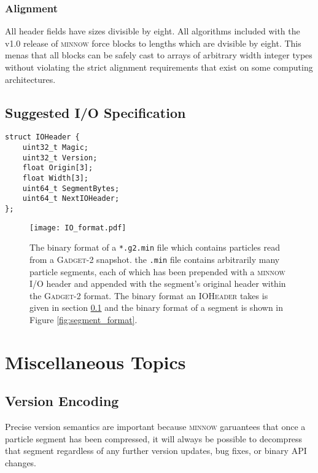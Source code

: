 \documentclass[numberedappendix,apj]{emulateapj}
\begin{document}
\subsubsection{Alignment}

All header fields have sizes divisible by eight. All algorithms included with
the v1.0 release of \textsc{minnow} force blocks to lengths which are dvisible
by eight. This menas that all blocks can be safely cast to arrays of
arbitrary width integer types without violating the strict alignment
requirements that exist on some computing architectures.

\subsection{Suggested I/O Specification}
\label{sec:IO_format}

\begin{verbatim}
struct IOHeader {
    uint32_t Magic;
    uint32_t Version;
    float Origin[3];
    float Width[3];
    uint64_t SegmentBytes;
    uint64_t NextIOHeader;
};
\end{verbatim}

\begin{figure}
   \centering
   \texttt{[image: IO\_format.pdf]}
   \caption{The binary format of a \texttt{*.g2.min} file which contains
   particles
   read from a \textsc{Gadget-2} snapshot. the \texttt{.min} file contains
   arbitrarily many particle segments, each of which has been prepended with
   a \textsc{minnow} I/O header and appended with the segment's original header
   within the \textsc{Gadget-2} format. The binary format an \textsc{IOHeader}
   takes is given in section \ref{sec:IO_format} and the binary format of
   a segment is shown in Figure \ref{fig:segment_format}.}
   \label{fig:IO_format}
\end{figure}

\section{Miscellaneous Topics}

\subsection{Version Encoding}
\label{sec:version}

Precise version semantics are important because \textsc{minnow}
garuantees that once a particle segment has been compressed, it will
always be possible to decompress that segment regardless of any further version
updates, bug fixes, or binary API changes.
\end{document}
